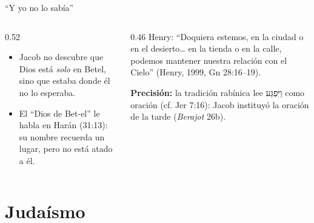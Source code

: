 \documentclass[hyperref={bookmarks=false},aspectratio=169]{beamer}
\newcommand{\heb}[1]{\mbox{\foreignlanguage{hebrew}{#1}}}
\newcommand{\precision}[1]{{\footnotesize\color{gris}\textbf{Precisión:} #1}}
\begin{document}
\begin{frame}{``Y yo no lo sabía''}
\centering
{}\par\medskip
\begin{columns}[t,onlytextwidth]
\begin{column}{0.52\textwidth}\small
\begin{itemize}
\item Jacob no descubre que Dios está \emph{solo} en Betel, sino que estaba donde él no lo esperaba.
\item El ``Dios de Bet-el'' le habla en Harán (31:13): su nombre recuerda un lugar, pero no está atado a él.
\end{itemize}
\end{column}
\begin{column}{0.46\textwidth}\scriptsize
Henry: ``Doquiera estemos, en la ciudad o en el desierto\ldots{} en la tienda o en la calle, podemos mantener nuestra relación con el Cielo'' (Henry, 1999, Gn 28:16--19).\par\smallskip
\precision{la tradición rabínica lee \heb{וַיִּפְגַּע} como oración (cf. Jer 7:16): Jacob instituyó la oración de la tarde (\emph{Berajot} 26b).}
\end{column}
\end{columns}
\end{frame}

\section{Judaísmo}
\end{document}
